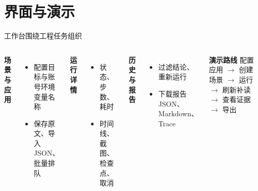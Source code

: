 \section{界面与演示}
\begin{frame}{工作台围绕工程任务组织}
\begin{columns}[T]
\textbf{场景与应用}
\begin{itemize}\item 配置目标与账号环境变量名称\item 保存原文、导入 JSON、批量排队\end{itemize}
\textbf{运行详情}
\begin{itemize}\item 状态、步数、耗时\item 时间线、截图、检查点、取消\end{itemize}
\textbf{历史与报告}
\begin{itemize}\item 过滤结论、重新运行\item 下载报告 JSON、Markdown、Trace\end{itemize}
\textbf{演示路线}
配置应用 $\rightarrow$ 创建场景 $\rightarrow$ 运行 $\rightarrow$ 刷新补读 $\rightarrow$ 查看证据 $\rightarrow$ 导出
\end{columns}
\end{frame}
